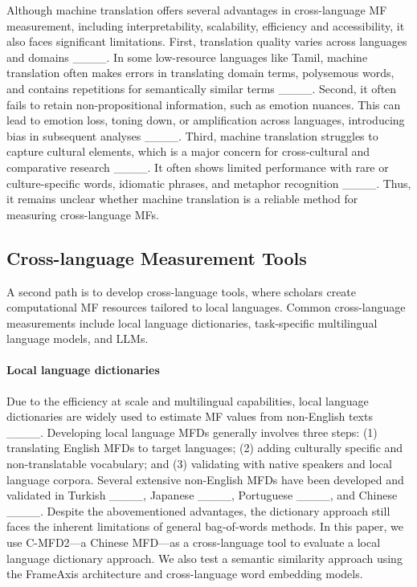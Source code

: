 Although machine translation offers several advantages in cross-language MF measurement, including interpretability, scalability, efficiency and accessibility, it also faces significant limitations. First, translation quality varies across languages and domains ____. In some low-resource languages like Tamil, machine translation often makes errors in translating domain terms, polysemous words, and contains repetitions for semantically similar terms ____. Second, it often fails to retain non-propositional information, such as emotion nuances. This can lead to emotion loss, toning down, or amplification across languages, introducing bias in subsequent analyses ____. Third, machine translation struggles to capture cultural elements, which is a major concern for cross-cultural and comparative research ____. It often shows limited performance with rare or culture-specific words, idiomatic phrases, and metaphor recognition ____. Thus, it remains unclear whether machine translation is a reliable method for measuring cross-language MFs. %

\subsection{Cross-language Measurement Tools}
A second path is to develop cross-language tools, where scholars create computational MF resources tailored to local languages. Common cross-language measurements include local language dictionaries, task-specific multilingual language models, and LLMs.

\paragraph{Local language dictionaries}
Due to the efficiency at scale and multilingual capabilities, local language dictionaries are widely used to estimate MF values from non-English texts ____. Developing local language MFDs generally involves three steps: (1) translating English MFDs to target languages; (2) adding culturally specific and non-translatable vocabulary; and (3) validating with native speakers and local language corpora.  Several extensive non-English MFDs have been developed and validated in Turkish ____, Japanese ____, Portuguese ____, and Chinese ____. Despite the abovementioned advantages, the dictionary approach still faces the inherent limitations of general bag-of-words methods. In this paper, we use C-MFD2---a Chinese MFD---as a cross-language tool to evaluate a local language dictionary approach. We also test a semantic similarity approach using the FrameAxis architecture and cross-language word embedding models. 

